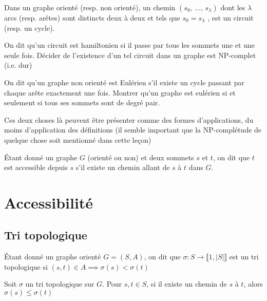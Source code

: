 \begin{definition}
	Dans un graphe orienté (resp. non orienté), un chemin $(s_0, \, \dots, \, s_\lambda)$ dont les $\lambda$ arcs (resp. arêtes) sont distincts deux à deux et tels que $s_0 = s_\lambda$ , est un circuit (resp. un cycle).
\end{definition}

\begin{example}
	On dit qu'un circuit est hamiltonien si il passe par tous les sommets une et une seule fois. Décider de l'existence d'un tel circuit dans un graphe est NP-complet (i.e. dur)
\end{example}

\begin{exercise}
	On dit qu’un graphe non orienté est Eulérien s’il existe un cycle passant par chaque arête exactement une fois. Montrer qu’un graphe est eulérien si et seulement si tous ses sommets sont de degré pair.
\end{exercise}

\begin{com}
	Ces deux choses là peuvent être présenter comme des formes d'applications, du moins d'application des définitions (il semble important que la NP-complétude de quelque chose soit mentionné dans cette leçon)
\end{com}

\begin{definition}[accessibilité]
	Étant donné un graphe $G$ (orienté ou non) et deux sommets $s$ et $t$, on dit que $t$ est accessible depuis $s$ s’il existe un chemin allant de $s$ à $t$ dans $G$.
\end{definition}

\section{Accessibilité}

\subsection{Tri topologique}

\begin{definition}
	Étant donné un graphe orienté $G = (S,A)$, on dit que $\sigma : S \to \llbracket 1,  |S| \rrbracket$ est un tri topologique si $(s,t) \in A \implies \sigma(s) < \sigma(t)$
\end{definition}

\begin{corollary}
	Soit $\sigma$ un tri topologique sur $G$. Pour $s, t \in S$, si il existe un chemin de $s$ à $t$, alors $\sigma(s) \leq \sigma(t)$
\end{corollary}

